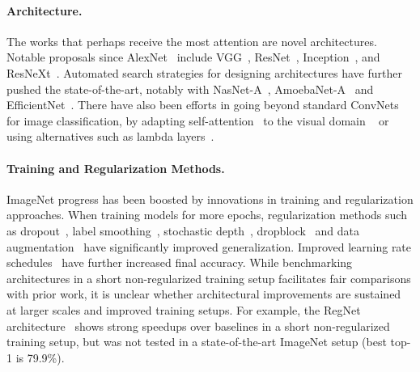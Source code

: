 \documentclass{article}
\begin{document}
\paragraph{Architecture.}
The works that perhaps receive the most attention are novel architectures.
Notable proposals since AlexNet~\cite{krizhevsky2012imagenet} include VGG~\cite{simonyan2014very}, ResNet~\cite{resnet}, Inception~\cite{szegedy2015going,szegedy2016rethinking}, and ResNeXt~\cite{xie2017aggregated}.
Automated search strategies for designing architectures have further pushed the state-of-the-art, notably with NasNet-A~\cite{zoph2018learning}, AmoebaNet-A~\cite{real2019regularized} and EfficientNet~\cite{tan2019efficientnet}.
There have also been efforts in going beyond standard ConvNets for image classification, 
by adapting self-attention~\citep{vaswani2017attention} to the visual domain
~\cite{bello2019attention,ramachandran2019stand,hu2019local,shen2020global,dosovitskiy2020image}
or using alternatives such as lambda layers~\cite{bello2021lambdanetworks}.

\paragraph{Training and Regularization Methods.}
ImageNet progress has been boosted by innovations in training and regularization approaches.
When training models for more epochs, regularization methods such as dropout~\cite{srivastava2014dropout}, 
label smoothing~\cite{szegedy2016rethinking},
stochastic depth~\cite{huang2016deep},
dropblock~\cite{ghiasi2018dropblock}
and data augmentation~\cite{zhang2017mixup,yun2019cutmix,cubuk2018autoaugment,cubuk2019randaugment} have significantly improved generalization.
Improved learning rate schedules~\cite{loshchilov2016sgdr,goyal2017accurate} have further increased final accuracy.
While benchmarking architectures in a short non-regularized training setup facilitates fair comparisons with prior work, it is unclear whether architectural improvements are sustained at larger scales and improved training setups.
For example, the RegNet architecture~\cite{radosavovic2020designing} shows strong speedups over baselines in a short non-regularized training setup, but was not tested in a state-of-the-art ImageNet setup (best top-1 is 79.9\%).
\end{document}

